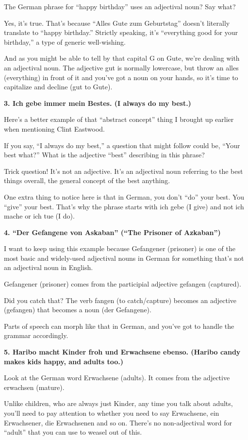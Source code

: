 \documentclass[a4paper,twocolumn,10pt]{article}
\begin{document}
The German phrase for “happy birthday” uses an adjectival noun? Say what?

Yes, it’s true. That’s because “Alles Gute zum Geburtstag” doesn’t literally translate to “happy birthday.” Strictly speaking, it’s “everything good for your birthday,” a type of generic well-wishing.

And as you might be able to tell by that capital G on Gute, we’re dealing with an adjectival noun. The adjective gut is normally lowercase, but throw an alles (everything) in front of it and you’ve got a noun on your hands, so it’s time to capitalize and decline (gut to Gute).

\textbf{3. Ich gebe immer mein Bestes. (I always do my best.)}

Here’s a better example of that “abstract concept” thing I brought up earlier when mentioning Clint Eastwood.

If you say, “I always do my best,” a question that might follow could be, “Your best what?” What is the adjective “best” describing in this phrase?

Trick question! It’s not an adjective. It’s an adjectival noun referring to the best things overall, the general concept of the best anything.

One extra thing to notice here is that in German, you don’t “do” your best. You “give” your best. That’s why the phrase starts with ich gebe (I give) and not ich mache or ich tue (I do).

\textbf{4. “Der Gefangene von Askaban” (“The Prisoner of Azkaban”)}

I want to keep using this example because Gefangener (prisoner) is one of the most basic and widely-used adjectival nouns in German for something that’s not an adjectival noun in English.

Gefangener (prisoner) comes from the participial adjective gefangen (captured).

Did you catch that? The verb fangen (to catch/capture) becomes an adjective (gefangen) that becomes a noun (der Gefangene).

Parts of speech can morph like that in German, and you’ve got to handle the grammar accordingly.

\textbf{5. Haribo macht Kinder froh und Erwachsene ebenso. (Haribo candy makes kids happy, and adults too.)}

Look at the German word Erwachsene (adults). It comes from the adjective erwachsen (mature).

Unlike children, who are always just Kinder, any time you talk about adults, you’ll need to pay attention to whether you need to say Erwachsene, ein Erwachsener, die Erwachsenen and so on. There’s no non-adjectival word for “adult” that you can use to weasel out of this.
\end{document}
